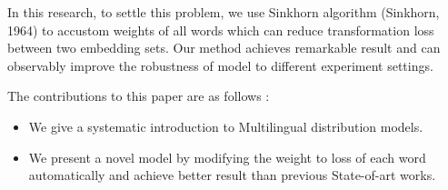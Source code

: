 In this research, 
	to settle this problem, 
	we use Sinkhorn algorithm (Sinkhorn, 1964) 
	to accustom weights of all words which can reduce transformation loss between two embedding sets. 
Our method achieves 
	remarkable result and can observably improve the robustness of model to different experiment settings.

The contributions to this paper are as follows :
\begin{itemize}
	\item We give a systematic introduction to Multilingual distribution models. 
	\item We present a novel model by modifying the weight to loss of each word automatically and achieve better result than previous State-of-art works.  
\end{itemize}



